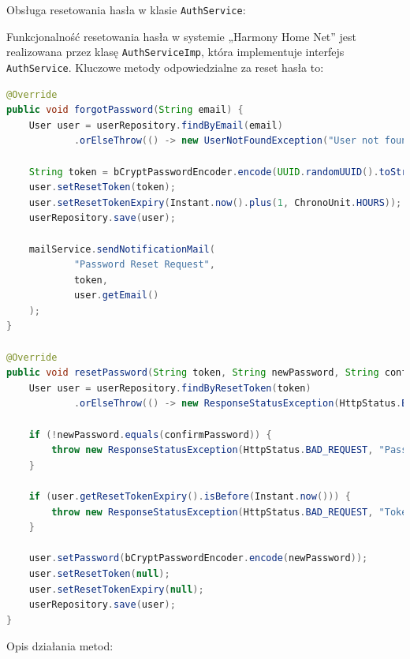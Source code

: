 Obsługa resetowania hasła w klasie \texttt{AuthService}:

Funkcjonalność resetowania hasła w systemie „Harmony Home Net” jest realizowana przez klasę \texttt{AuthServiceImp}, która implementuje interfejs \texttt{AuthService}. Kluczowe metody odpowiedzialne za reset hasła to:

\begin{lstlisting}[language=Java, caption=Metody resetowania hasła w klasie \texttt{AuthServiceImp}]
@Override
public void forgotPassword(String email) {
    User user = userRepository.findByEmail(email)
            .orElseThrow(() -> new UserNotFoundException("User not found"));

    String token = bCryptPasswordEncoder.encode(UUID.randomUUID().toString());
    user.setResetToken(token);
    user.setResetTokenExpiry(Instant.now().plus(1, ChronoUnit.HOURS));
    userRepository.save(user);

    mailService.sendNotificationMail(
            "Password Reset Request",
            token,
            user.getEmail()
    );
}

@Override
public void resetPassword(String token, String newPassword, String confirmPassword) {
    User user = userRepository.findByResetToken(token)
            .orElseThrow(() -> new ResponseStatusException(HttpStatus.BAD_REQUEST, "Invalid token"));

    if (!newPassword.equals(confirmPassword)) {
        throw new ResponseStatusException(HttpStatus.BAD_REQUEST, "Passwords do not match");
    }

    if (user.getResetTokenExpiry().isBefore(Instant.now())) {
        throw new ResponseStatusException(HttpStatus.BAD_REQUEST, "Token has expired");
    }

    user.setPassword(bCryptPasswordEncoder.encode(newPassword));
    user.setResetToken(null);
    user.setResetTokenExpiry(null);
    userRepository.save(user);
}
\end{lstlisting}

Opis działania metod:

